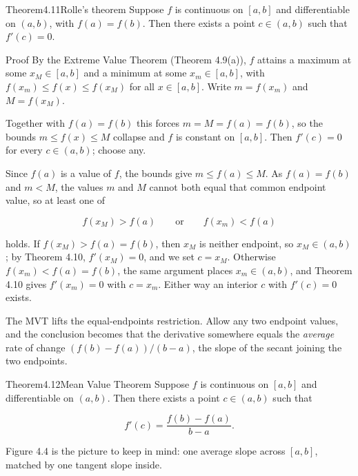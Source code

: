 \documentclass[a4paper,12pt,oneside]{memoir}
\begin{document}
\begin{envtheorem}{Theorem}{4.11}{Rolle’s theorem}
Suppose \(f\) is continuous on \([a, b]\) and differentiable on \((a, b)\), with \(f(a) = f(b)\). Then there exists a point \(c \in (a, b)\) such that \(f'(c) = 0\).
\end{envtheorem}
\begin{envproof}{Proof}{}{}
By the Extreme Value Theorem (Theorem 4.9(a)), \(f\) attains a maximum at some \(x_{M} \in [a, b]\) and a minimum at some \(x_{m} \in [a, b]\), with \(f(x_{m}) \le f(x) \le f(x_{M})\) for all \(x \in [a, b]\). Write \(m = f(x_{m})\) and \(M = f(x_{M})\).

 Together with \(f(a) = f(b)\) this forces \(m = M = f(a) = f(b)\), so the bounds \(m \le f(x) \le M\) collapse and \(f\) is constant on \([a, b]\). Then \(f'(c) = 0\) for every \(c \in (a, b)\); choose any.

 Since \(f(a)\) is a value of \(f\), the bounds give \(m \le f(a) \le M\). As \(f(a) = f(b)\) and \(m < M\), the values \(m\) and \(M\) cannot both equal that common endpoint value, so at least one of

\[ f(x_{M}) > f(a) \qquad \text{or} \qquad f(x_{m}) < f(a) \]

holds. If \(f(x_{M}) > f(a) = f(b)\), then \(x_{M}\) is neither endpoint, so \(x_{M} \in (a, b)\); by Theorem 4.10, \(f'(x_{M}) = 0\), and we set \(c = x_{M}\). Otherwise \(f(x_{m}) < f(a) = f(b)\), the same argument places \(x_{m} \in (a, b)\), and Theorem 4.10 gives \(f'(x_{m}) = 0\) with \(c = x_{m}\). Either way an interior \(c\) with \(f'(c) = 0\) exists. \qedmark
\end{envproof}
The MVT lifts the equal-endpoints restriction. Allow any two endpoint values, and the conclusion becomes that the derivative somewhere equals the \emph{average} rate of change \((f(b) - f(a))/(b - a)\), the slope of the secant joining the two endpoints.

\begin{envtheorem}{Theorem}{4.12}{Mean Value Theorem}
Suppose \(f\) is continuous on \([a, b]\) and differentiable on \((a, b)\). Then there exists a point \(c \in (a, b)\) such that

\[ f'(c) = \frac{f(b) - f(a)}{b - a}. \]
\end{envtheorem}
Figure 4.4 is the picture to keep in mind: one average slope across \([a,b]\), matched by one tangent slope inside.
\end{document}

